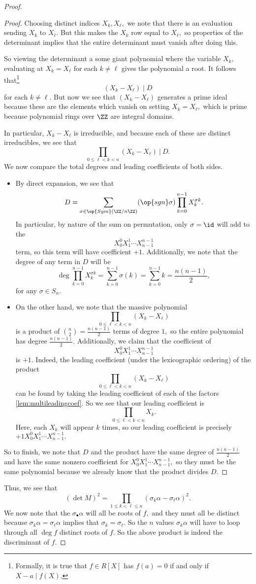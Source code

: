 \documentclass[../notes.tex]{subfiles}
\begin{document}
\begin{proof}
\begin{proof}
		Choosing distinct indices $X_k,X_\ell,$ we note that there is an evaluation sending $X_k$ to $X_\ell.$ But this makes the $X_k$ row equal to $X_\ell,$ so properties of the determinant implies that the entire determinant must vanish after doing this.
	
		So viewing the determinant a some giant polynomial where the variable $X_k,$ evaluating at $X_k=X_\ell$ for each $k\ne\ell$ gives the polynomial a root. It follows that\footnote{Formally, it is true that $f\in R[X]$ has $f(a)=0$ if and only if $X-a\mid f(X).$}
		\[(X_k-X_\ell)\mid D\]
		for each $k\ne\ell.$ But now we see that $(X_k-X_\ell)$ generates a prime ideal because these are the elements which vanish on setting $X_k=X_\ell,$ which is prime because polynomial rings over $\ZZ$ are integral domains.
		
		In particular, $X_k-X_\ell$ is irreducible, and because each of these are distinct irreducibles, we see that
		\[\prod_{0\le \ell<k< n}(X_k-X_\ell)~\bigg|~D.\]
		We now compare the total degrees and leading coefficients of both sides.
		\begin{itemize}
			\item By direct expansion, we see that
			\[D=\sum_{\sigma\in\op{Sym}(\ZZ/n\ZZ)}(\op{sgn}\sigma)\prod_{k=0}^{n-1}X_k^{\sigma k}.\]
			In particular, by nature of the sum on permutation, only $\sigma=\id$ will add to the
			\[X_0^0X_1^1\cdots X_{n-1}^{n-1}\]
			term, so this term will have coefficient $+1.$ Additionally, we note that the degree of any term in $D$ will be
			\[\deg\prod_{k=0}^{n-1}X_k^{\sigma k}=\sum_{k=0}^{n-1}\sigma(k)=\sum_{k=0}^{n-1}k=\frac{n(n-1)}2,\]
			for any $\sigma\in S_n.$
			\item On the other hand, we note that the massive polynomial
			\[\prod_{0\le \ell<k< n}(X_k-X_\ell)\]
			is a product of $\binom n2=\frac{n(n-1)}2$ terms of degree $1,$ so the entire polynomial has degree $\frac{n(n-1)}2.$ Additionally, we claim that the coefficient of
			\[X_0^0X_1^1\cdots X_{n-1}^{n-1}\]
			is $+1.$ Indeed, the leading coefficient (under the lexicographic ordering) of the product
			\[\prod_{0\le \ell<k< n}(X_k-X_\ell)\]
			can be found by taking the leading coefficient of each of the factors \autoref{lem:multileadingcoef}. So we see that our leading coefficient is
			\[\prod_{0\le \ell<k< n}X_k.\]
			Here, each $X_k$ will appear $k$ times, so our leading coefficient is precisely $+1X_0^0X_1^1\cdots X_{n-1}^{n-1}.$
		\end{itemize}
		So to finish, we note that $D$ and the product have the same degree of $\frac{n(n-1)}2$ and have the same nonzero coefficient for $X_0^0X_1^1\cdots X_{n-1}^{n-1},$ so they must be the same polynomial because we already know that the product divides $D.$
	\end{proof}
	Thus, we see that
	\[(\det M)^2=\prod_{1\le k<\ell\le n}(\sigma_k\alpha-\sigma_\ell\alpha)^2.\]
	We now note that the $\sigma_\bullet\alpha$ will all be roots of $f,$ and they must all be distinct because $\sigma_k\alpha=\sigma_\ell\alpha$ implies that $\sigma_k=\sigma_\ell.$ So the $n$ values $\sigma_k\alpha$ will have to loop through all $\deg f$ distinct roots of $f.$ So the above product is indeed the discriminant of $f.$
\end{proof}
\end{document}
